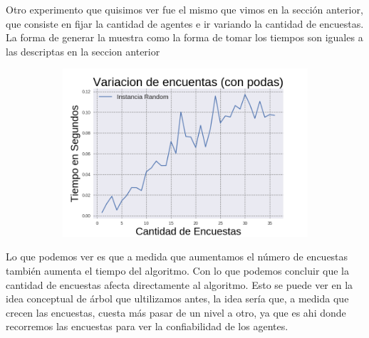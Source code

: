 	Otro experimento que quisimos ver fue el mismo que vimos en la sección anterior, que consiste en fijar la cantidad de agentes e ir variando la cantidad de encuestas. La forma de generar la muestra como la forma de tomar los tiempos son iguales a las descriptas en la seccion anterior
	
	\begin{figure}[h]
	\begin{subfigure}{0.5\textwidth}
	\includegraphics[scale=0.45]{VariacionesConPodas.png}
	\end{subfigure}
	\end{figure}
	
	Lo que podemos ver es que a medida que aumentamos el número de encuestas también aumenta el tiempo del algoritmo. Con lo que podemos concluir que la cantidad de encuestas afecta directamente al algoritmo. Esto se puede ver en la idea conceptual de árbol que ultilizamos antes, la idea sería que, a medida que crecen las encuestas, cuesta más pasar de un nivel a otro, ya que es ahi donde recorremos las encuestas para ver la confiabilidad de los agentes. 